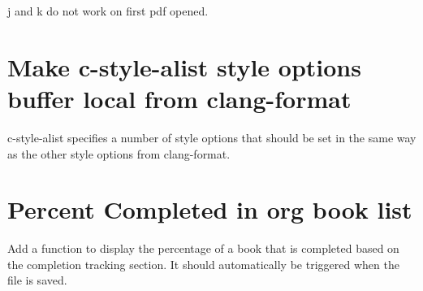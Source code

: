 \documentclass{default}
\begin{document}
j and k do not work on first pdf opened.

\section{Make c-style-alist style options buffer local from clang-format}

c-style-alist specifies a number of style options that should be set in the same way as the other
style options from clang-format.

\section{Percent Completed in org book list}

Add a function to display the percentage of a book that is completed based on the completion
tracking section. It should automatically be triggered when the file is saved.
\end{document}
